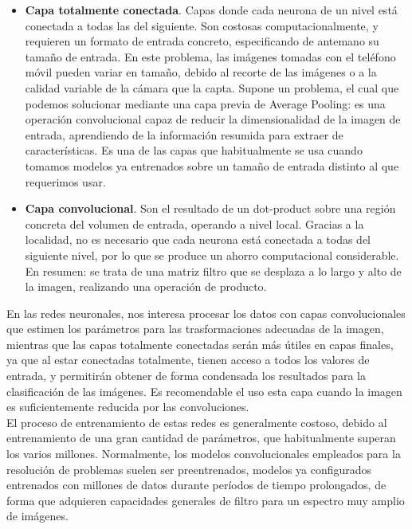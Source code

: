 \begin{itemize}
	\item \textbf{Capa totalmente conectada}. Capas donde cada neurona de un nivel está conectada a todas las del siguiente. Son costosas computacionalmente, y requieren un formato de entrada concreto, especificando de antemano su tamaño de entrada. En este problema, las imágenes tomadas con el teléfono móvil pueden variar en tamaño, debido al recorte de las imágenes o a la calidad variable de la cámara que la capta. Supone un problema, el cual que podemos solucionar mediante una capa previa de Average Pooling: es una operación convolucional capaz de reducir la dimensionalidad de la imagen de entrada, aprendiendo de la información resumida para extraer de características. Es una de las capas que habitualmente se usa cuando tomamos modelos ya entrenados sobre un tamaño de entrada distinto al que requerimos usar.
	\item \textbf{Capa convolucional}. Son el resultado de un dot-product sobre una región concreta del volumen de entrada, operando a nivel local. Gracias a la localidad, no es necesario que cada neurona está conectada a todas del siguiente nivel, por lo que se produce un ahorro computacional considerable. En resumen: se trata de una matriz filtro que se desplaza a lo largo y alto de la imagen, realizando una operación de producto.
\end{itemize}

En las redes neuronales, nos interesa procesar los datos con capas convolucionales que estimen los parámetros para las trasformaciones adecuadas de la imagen, mientras que las capas totalmente conectadas serán más útiles en capas finales, ya que al estar conectadas totalmente, tienen acceso a todos los valores de entrada, y permitirán obtener de forma condensada los resultados para la clasificación de las imágenes. Es recomendable el uso esta capa cuando la imagen es suficientemente reducida por las convoluciones.\\

El proceso de entrenamiento de estas redes es generalmente costoso, debido al entrenamiento de una gran cantidad de parámetros, que habitualmente superan los varios millones. Normalmente, los modelos convolucionales empleados para la resolución de problemas suelen ser preentrenados, modelos ya configurados entrenados con millones de datos durante períodos de tiempo prolongados, de forma que adquieren capacidades generales de filtro para un espectro muy amplio de imágenes.\\

